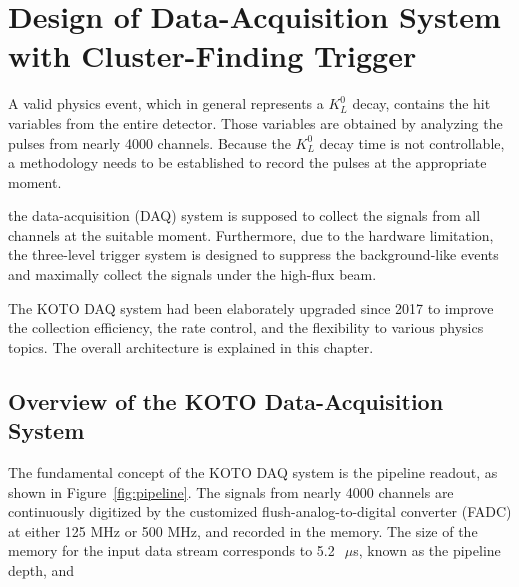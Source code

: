 
\chapter{Design of Data-Acquisition System with Cluster-Finding Trigger} %

\label{Chapter4} %


A valid physics event, which in general represents a $K_L^0$ decay, contains the hit variables from the entire detector. Those variables are obtained by analyzing the pulses from nearly 4000 channels. Because the $K_L^0$ decay time is not controllable, a methodology needs to be established to record the pulses at the appropriate moment.


the data-acquisition (DAQ) system is supposed to collect the signals from all channels at the suitable moment. Furthermore, due to the hardware limitation, the three-level trigger system is designed to suppress the background-like events and maximally collect the signals under the high-flux beam. 

The KOTO DAQ system had been elaborately upgraded since 2017 to improve the collection efficiency, the rate control, and the flexibility to various physics topics. The overall architecture is explained in this chapter. 


\section{Overview of the KOTO Data-Acquisition System}
The fundamental concept of the KOTO DAQ system is the pipeline readout, as shown in Figure~\ref{fig:pipeline}. The signals from nearly 4000 channels are continuously digitized by the customized flush-analog-to-digital converter (FADC) at either 125 MHz or 500 MHz, and recorded in the memory. The size of the memory for the input data stream corresponds to 5.2~$\SI{}{\mu}$s, known as the pipeline depth, and  



